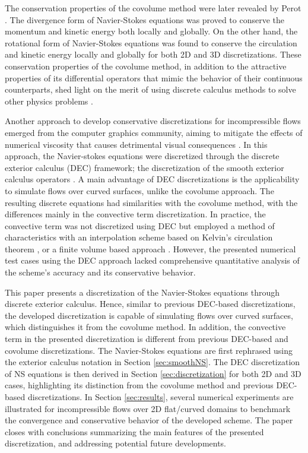 \documentclass[final,12pt,times]{elsarticle}
\begin{document}
The conservation properties of the covolume method were later revealed by Perot \cite{perot2000conservation}. The divergence form of Navier-Stokes equations was proved to conserve the momentum and kinetic energy both locally and globally. On the other hand, the rotational form of Navier-Stokes equations was found to conserve the circulation and kinetic energy locally and globally for both 2D \cite{perot2000conservation} and 3D \cite{zhang2002accuracy} discretizations. These conservation properties of the covolume method, in addition to the attractive properties of its differential operators that mimic the behavior of their continuous counterparts, shed light on the merit of using discrete calculus methods to solve other physics problems \cite{perot2007discrete}.         

Another approach to develop conservative discretizations for incompressible flows emerged from the computer graphics community, aiming to mitigate the effects of numerical viscosity that causes detrimental visual consequences \cite{elcott2007stable,mullen2009energy}. In this approach, the Navier-stokes equations were discretized through the discrete exterior calculus (DEC) framework; the discretization of the smooth exterior calculus operators \cite{hirani2003discrete,desbrun2005discrete}. A main advantage of DEC discretizations is the applicability to simulate flows over curved surfaces, unlike the covolume approach. The resulting discrete equations had similarities with the covolume method, with the differences mainly in the convective term discretization. In practice, the convective term was not discretized using DEC but employed a method of characteristics with an interpolation scheme based on Kelvin's circulation theorem \cite{elcott2007stable}, or a finite volume based approach \cite{mullen2009energy}. However, the presented numerical test cases using the DEC approach lacked comprehensive quantitative analysis of the scheme's accuracy and its conservative behavior.

This paper presents a discretization of the Navier-Stokes equations through discrete exterior calculus. Hence, similar to previous DEC-based discretizations, the developed discretization is capable of simulating flows over curved surfaces, which distinguishes it from the covolume method. In addition, the convective term in the presented discretization is different from previous DEC-based and covolume discretizations. The Navier-Stokes equations are first rephrased using the exterior calculus notation in Section \ref{sec:smoothNS}. The DEC discretization of NS equations is then derived in Section \ref{sec:discretization} for both 2D and 3D cases, highlighting its distinction from the covolume method and previous DEC-based discretizations. In Section \ref{sec:results}, several numerical experiments are illustrated for incompressible flows over 2D flat/curved domains to benchmark the convergence and conservative behavior of the developed scheme. The paper closes with conclusions summarizing the main features of the presented discretization, and addressing potential future developments.                
            
\end{document}
